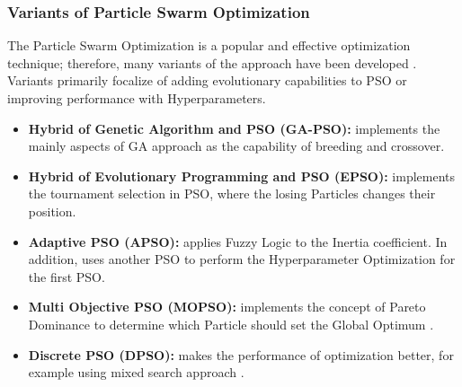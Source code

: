 \subsubsection{Variants of Particle Swarm Optimization}

The Particle Swarm Optimization is a popular and effective optimization technique; therefore, many variants of the approach have been developed \cite{Tesi-3.2}.
\\[0.3cm]Variants primarily focalize of adding evolutionary capabilities to PSO or improving performance with Hyperparameters.
\begin{itemize}[itemsep=0.1cm]
    \item \textbf{Hybrid of Genetic Algorithm and PSO (GA-PSO):} implements the mainly aspects of GA approach as the capability of breeding and crossover.
    \item \textbf{Hybrid of Evolutionary Programming and PSO (EPSO):} implements the tournament selection in PSO, where the losing Particles changes their position.
    \item \textbf{Adaptive PSO (APSO):} applies Fuzzy Logic to the Inertia coefficient. In addition, uses another PSO to perform the Hyperparameter Optimization for the first PSO.
    \item \textbf{Multi Objective PSO (MOPSO):} implements the concept of Pareto Dominance to determine which Particle should set the Global Optimum \cite{Tesi-3.5}.
    \item \textbf{Discrete PSO (DPSO):} makes the performance of optimization better, for example using mixed search approach \cite{Tesi-3.5}.
\end{itemize}
% 
% 
% 
% 
% 

